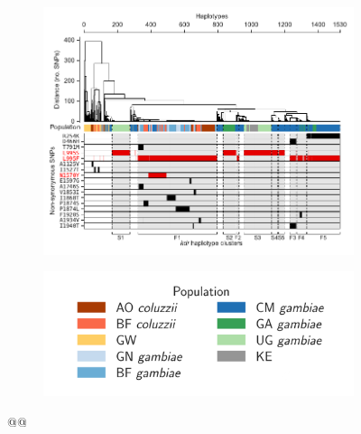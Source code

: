 \documentclass[a4paper,11pt,abstracton,hidelinks]{scrartcl}
\begin{document}
\begin{figure}[t!]
\centering
\begin{subfigure}[t]{1\textwidth}
\includegraphics[width=1\linewidth,center]{artwork/chapter6/hapclust.pdf}
\end{subfigure}
\begin{subfigure}[t]{1\textwidth}
\includegraphics[width=.5\linewidth,center]{artwork/chapter6/pop_legend.png}
\end{subfigure}
\caption{@@
}
\label{fig:hapclust}
\end{figure}
\end{document}
